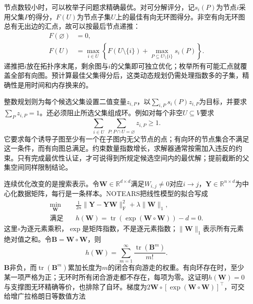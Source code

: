 节点数较小时，可以枚举子问题求精确最优。对可分解评分，记$s_i(P)$为节点$i$采用父集$P$的得分，$F(U)$为节点子集$U$上的最佳有向无环图得分。非空有向无环图总有无出边的汇点，故可以按最后节点递推：
\begin{equation}
  \begin{aligned}
    F(\varnothing)&=0,\\
    F(U)&=\max_{i\in U}\left\{
      F(U\setminus\{i\})
      +\max_{P\subseteq U\setminus\{i\}}s_i(P)\right\}.
  \end{aligned}
  \label{eq:pgm-structure-learning-dp}
\end{equation}
递推把$i$放在拓扑序末尾，剩余图与$i$的父集即可独立优化；枚举所有可能汇点就覆盖全部有向图。预计算最佳父集得分后，这类动态规划仍需处理指数多的子集，精确性是用时间和内存换来的。

整数规划则为每个候选父集设置二值变量$z_{i,P}$，以$\sum_{i,P}s_i(P)z_{i,P}$为目标，并要求$\sum_Pz_{i,P}=1$。还必须阻止所选父集组成环。例如对每个非空$U\subseteq V$要求
\[
  \sum_{i\in U}\ \sum_{P:P\cap U=\varnothing}z_{i,P}\geq1.
\]
它要求每个诱导子图至少有一个在子图内无父节点的点；有向环的节点集合不满足这一条件，而有向图总满足。约束数量指数增长，求解器通常按需加入违反的约束。只有完成最优性认证，才可说得到所规定候选空间内的最优解；提前截断的父集空间同样限制结论。

连续优化改变的是搜索表示。令$\bm{W}\in\mathbb{R}^{d\times d}$满足$W_{i,j}\ne0$对应$i\to j$，$\bm{Y}\in\mathbb{R}^{n\times d}$为中心化数据矩阵，每行是一条样本。NOTEARS把线性模型的拟合写成
\begin{equation}
  \begin{aligned}
    \min_{\bm{W}}\quad&
      \frac{1}{2n}\lVert\bm{Y}-\bm{Y}\bm{W}\rVert_{\mathrm F}^{2}
      +\lambda\lVert\bm{W}\rVert_1,\\
    \text{满足}\quad&
      h(\bm{W})=
      \operatorname{tr}\!\left(\exp(\bm{W}\circ\bm{W})\right)-d=0.
  \end{aligned}
  \label{eq:pgm-structure-learning-notears}
\end{equation}
这里$\circ$为逐元素乘积，$\exp$是矩阵指数，不是逐元素指数；$\lVert\bm{W}\rVert_1$表示所有元素绝对值之和。令$\bm{B}=\bm{W}\circ\bm{W}$，则
\[
  h(\bm{W})=\sum_{m=1}^{\infty}
     \frac{\operatorname{tr}(\bm{B}^m)}{m!}.
\]
$\bm{B}$非负，而$\operatorname{tr}(\bm{B}^m)$累加长度为$m$的闭合有向游走的权重。有向环存在时，至少某一项严格为正；无环时所有闭合游走都不存在，每项为零。这证明$h(\bm{W})=0$与支撑图无环精确等价，也排除了自环。梯度为$2\bm{W}\circ[\exp(\bm{W}\circ\bm{W})]^{\top}$，可交给增广拉格朗日等数值方法

